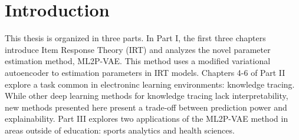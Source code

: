 \chapter*{Introduction}
This thesis is organized in three parts. In Part I, the first three chapters introduce Item Response Theory (IRT) and analyzes the novel parameter estimation method, ML2P-VAE. This method uses a modified variational autoencoder to estimation parameters in IRT models. Chapters 4-6 of Part II explore a task common in electroninc learning environments: knowledge tracing. While other deep learning methods for knowledge tracing lack interpretability, new methods presented here present a trade-off between prediction power and explainability. Part III explores two applications of the ML2P-VAE method in areas outside of education: sports analytics and health sciences.

